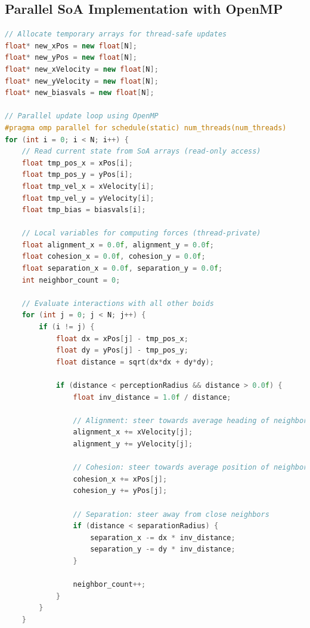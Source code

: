 \documentclass[10pt,twocolumn,letterpaper]{article}
\begin{document}
\subsection*{Parallel SoA Implementation with OpenMP}
\label{appendix:parloop}
\begin{lstlisting}[language=C++, caption=Parallel Boids implementation using OpenMP]
// Allocate temporary arrays for thread-safe updates
float* new_xPos = new float[N];
float* new_yPos = new float[N];
float* new_xVelocity = new float[N];
float* new_yVelocity = new float[N];
float* new_biasvals = new float[N];

// Parallel update loop using OpenMP
#pragma omp parallel for schedule(static) num_threads(num_threads)
for (int i = 0; i < N; i++) {
    // Read current state from SoA arrays (read-only access)
    float tmp_pos_x = xPos[i];
    float tmp_pos_y = yPos[i];
    float tmp_vel_x = xVelocity[i];
    float tmp_vel_y = yVelocity[i];
    float tmp_bias = biasvals[i];
    
    // Local variables for computing forces (thread-private)
    float alignment_x = 0.0f, alignment_y = 0.0f;
    float cohesion_x = 0.0f, cohesion_y = 0.0f;
    float separation_x = 0.0f, separation_y = 0.0f;
    int neighbor_count = 0;
    
    // Evaluate interactions with all other boids
    for (int j = 0; j < N; j++) {
        if (i != j) {
            float dx = xPos[j] - tmp_pos_x;
            float dy = yPos[j] - tmp_pos_y;
            float distance = sqrt(dx*dx + dy*dy);
            
            if (distance < perceptionRadius && distance > 0.0f) {
                float inv_distance = 1.0f / distance;
                
                // Alignment: steer towards average heading of neighbors
                alignment_x += xVelocity[j];
                alignment_y += yVelocity[j];
                
                // Cohesion: steer towards average position of neighbors
                cohesion_x += xPos[j];
                cohesion_y += yPos[j];
                
                // Separation: steer away from close neighbors
                if (distance < separationRadius) {
                    separation_x -= dx * inv_distance;
                    separation_y -= dy * inv_distance;
                }
                
                neighbor_count++;
            }
        }
    }
    

\end{lstlisting}
\end{document}
